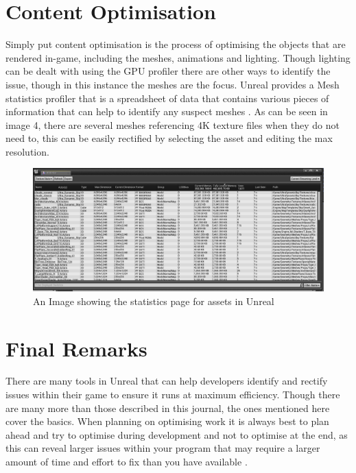 \documentclass{scrartcl}
\begin{document}
\section{Content Optimisation}
Simply put content optimisation is the process of optimising the objects that are rendered in-game, including the meshes, animations and lighting. Though lighting can be dealt with using the GPU profiler there are other ways to identify the issue,     though in this instance the meshes are the focus. Unreal provides a Mesh statistics profiler that is a spreadsheet of data that contains various pieces of information that can help to identify any suspect meshes \cite{Content}. As can be seen in image 4, there are several meshes referencing 4K texture files when they do not need to, this can be easily rectified by selecting the asset and editing the max resolution.

\begin{figure}[h]
	\centering
	\includegraphics[width=\textwidth]{Image3}
	\caption{An Image showing the statistics page for assets in Unreal}
	\label{Image3}
\end{figure}

\section{Final Remarks}
There are many tools in Unreal that can help developers identify and rectify issues within their game to ensure it runs at maximum efficiency. Though there are many more than those described in this journal, the ones mentioned here cover the basics. When planning on optimising work it is always best to plan ahead and try to optimise during development and not to optimise at the end, as this can reveal larger issues within your program that may require a larger amount of time and effort to fix than you have available \cite{UEPerformance}.
	
	
	
	
	
	
\end{document}
